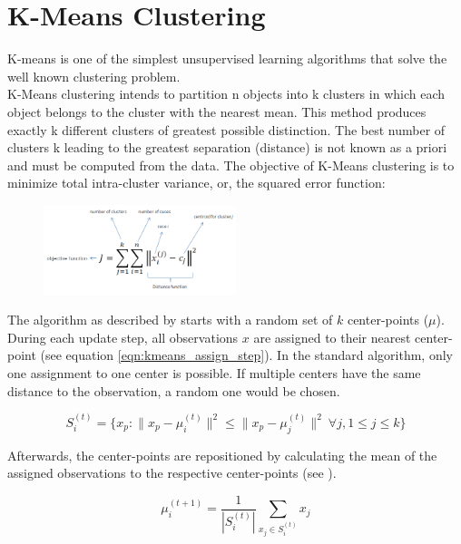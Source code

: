 \section{ K-Means Clustering }
K-means \cite{kmeans} is one of the simplest unsupervised learning algorithms that solve the well known clustering problem. \\ K-Means clustering intends to partition n objects into k clusters in which each object belongs to the cluster with the nearest mean. This method produces exactly k different clusters of greatest possible distinction. The best number of clusters k leading to the greatest separation (distance) is not known as a priori and must be computed from the data. The objective of K-Means clustering is to minimize total intra-cluster variance, or, the squared error function:
\begin{figure}[H]
\centering
\includegraphics[width=0.5\textwidth]{img/ckmeans.png}
\end{figure}

 The algorithm as described by \cite{kmeans} starts with a random set of $k$ center-points ($\mu$). During each update step, all observations $x$ are assigned to their nearest center-point (see equation \ref{eqn:kmeans_assign_step}). In the standard algorithm, only one assignment to one center is possible. If multiple centers have the same distance to the observation, a random one would be chosen.

\begin{equation}
S_i^{(t)} = \big \{ x_p : \big \| x_p - \mu^{(t)}_i \big \|^2 \le \big \| x_p - \mu^{(t)}_j \big \|^2 \ \forall j, 1 \le j \le k \big\}
\label{eqn:kmeans_assign_step}
\end{equation}

Afterwards, the center-points are repositioned by calculating the mean of the assigned observations to the respective center-points (see ).

\begin{equation}
\mu^{(t+1)}_i = \frac{1}{|S^{(t)}_i|} \sum_{x_j \in S^{(t)}_i} x_j
\label{eqn:kmeans_update_step}
\end{equation}


